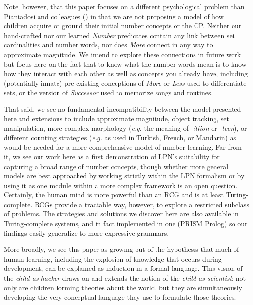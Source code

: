 \documentclass[10pt,letterpaper]{article}
\begin{document}
Note, however, that this paper focuses on a different psychological
problem than Piantadosi and colleagues (\citeyear{PianGoodTen2012}) in
that we are not proposing a model of how children acquire or ground
their initial number concepts or the CP. Neither our hand-crafted nor
our learned \emph{Number} predicates contain any link between set
cardinalities and number words, nor does \emph{More} connect in any
way to approximate magnitude. We intend to explore these connections
in future work but focus here on the fact that to know what the number
words mean is to know how they interact with each other as well as
concepts you already have, including (potentially innate) pre-existing
conceptions of \emph{More} or \emph{Less} used to differentiate sets,
or the version of \emph{Successor} used to memorize songs and
routines.

That said, we see no fundamental incompatibility between the model
presented here and extensions to include approximate magnitude, object
tracking, set manipulation, more complex morphology ({\it e.g.} the
meaning of \emph{-illion} or \emph{-teen}), or different counting
strategies ({\it e.g.} as used in Turkish, French, or Mandarin) as
would be needed for a more comprehensive model of number learning. Far
from it, we see our work here as a first demonstration of LPN's
suitability for capturing a broad range of number concepts, though
whether more general models are best approached by working strictly
within the LPN formalism or by using it as one module within a more
complex framework is an open question. Certainly, the human mind is
more powerful than an RCG and is at least Turing-complete. RCGs
provide a tractable way, however, to explore a restricted subclass of
problems. The strategies and solutions we discover here are also
available in Turing-complete systems, and in fact implemented in one
(PRISM Prolog) so our findings easily generalize to more expressive
grammars.

More broadly, we see this paper as growing out of the hypothesis that
much of human learning, including the explosion of knowledge that
occurs during development, can be explained as induction in a formal
language. This vision of the \emph{child-as-hacker} draws on and
extends the notion of the \emph{child-as-scientist}; not only are
children forming theories about the world, but they are simultaneously
developing the very conceptual language they use to formulate those
theories.

\end{document}
